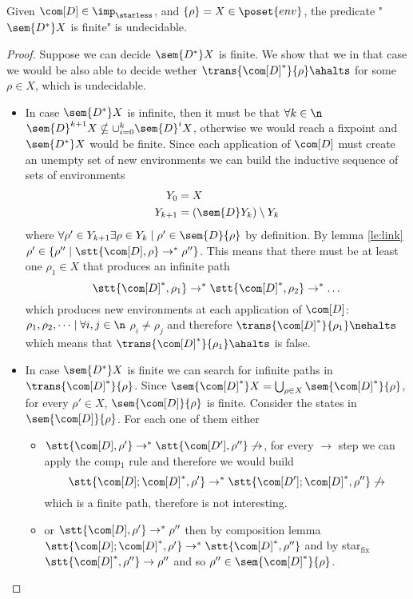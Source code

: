 \begin{lemma}\label{le:infiniteness}
  Given \(\com[D]\in\imp_\starless\), and \(\{\rho\} = X \in
  \poset{env}\), the predicate "\(\sem{D^*}X\) is finite" is
  undecidable.
\end{lemma}

\begin{proof}
  Suppose we can decide \(\sem{D^*}X\) is finite. We show that we in
  that case we would be also able to decide wether
  \(\trans{\com[D]^*}{\rho}\ahalts\) for some \(\rho \in X\), which is
  undecidable.%
  \begin{itemize}
  \item In case \(\sem{D^*}X\) is infinite, then it must be that
    \(\forall k \in \n\) \(\sem{D}^{k+1}X \nsubseteq
    \cup_{i=0}^k\sem{D}^iX\), otherwise we would reach a fixpoint
    and \(\sem{D^*}X\) would be finite. Since each application of
    \(\com[D]\) must create an unempty set of new environments we can
    build the inductive sequence of sets of environments
    \begin{align*}
      Y_0 & = X \\
      Y_{k+1} & = (\sem{D}Y_k)\setminus Y_k
    \end{align*}
    where \(\forall \rho' \in Y_{k+1} \exists \rho \in Y_k \mid \rho'
    \in \sem{D}\{\rho\}\) by definition. By lemma \ref{le:link}
    \(\rho' \in \{\rho'' \mid \stt{\com[D], \rho} \to^*
    \rho''\}\). This means that there must be at least one \(\rho_1\in
    X\) that produces an infinite path \[\stt{\com[D]^*,
      \rho_1}\to^*\stt{\com[D]^*, \rho_2}\to^*\dots \] which produces
    new environments at each application of \(\com[D]\): \(\rho_1,
    \rho_2, \dots \mid \forall i,j \in \n\) \(\rho_i \neq \rho_j\) and
    therefore \(\trans{\com[D]^*}{\rho_1} \nehalts\) which means that
    \(\trans{\com[D]^*}{\rho_1}\ahalts\) is false.
  \item In case \(\sem{D^*}X\) is finite we can search for infinite
    paths in \(\trans{\com[D]^*}{\rho}\). Since
    \(\sem{\com[D]^*}X = \bigcup_{\rho\in X}\sem{\com[D]^*}\{\rho\}\),
    for every \(\rho' \in X\), \(\sem{\com[D]}\{\rho\}\) is
    finite. Consider the states in \(\sem{\com[D]}\{\rho\}\). For each
    one of them either
    \begin{itemize}
    \item
      \(\stt{\com[D], \rho'} \to^* \stt{\com[D'], \rho''} \not\to\),
      for every \(\to\) step we can apply the comp\(_1\) rule and
      therefore we would build
      \[\stt{\com[D];\com[D]^*, \rho'} \to^* \stt{\com[D']; \com[D]^*,
          \rho''} \not\to\] which is a finite path, therefore is not
      interesting.
    \item or \(\stt{\com[D], \rho'} \to^* \rho''\) then by composition
      lemma
      \(\stt{\com[D]; \com[D]^*, \rho'} \to^* \stt{\com[D]^*,
        \rho''}\) and by star\(_{\text{fix}}\)
      \(\stt{\com[D]^*, \rho''} \to \rho''\) and so
      \(\rho'' \in \sem{\com[D]^*}\{\rho\}\).
    \end{itemize}
  \end{itemize}
\end{proof}
